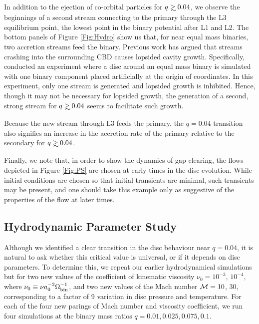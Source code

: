 In addition to the ejection of co-orbital particles for $q\gsim 0.04$,
we observe the beginnings of a second stream connecting to the primary
through the L3 equilibrium point, the lowest point in the
binary potential after L1 and L2. The bottom panels of Figure
\ref{Fig:Hydro} show us that, for near equal mass binaries, two accretion streams feed the binary. 
Previous work \citep{ShiKrolik:2012, DHM:2013:MNRAS} has argued 
that streams crashing into the surrounding CBD causes lopsided cavity growth. Specifically, \citep{DHM:2013:MNRAS} conducted an experiment where a disc around an equal mass binary is simulated with one binary component placed artificially at the origin of coordinates. In this experiment, only one stream is generated and lopsided growth is inhibited. Hence, though it may not be necessary for lopsided growth, the generation of a second, strong stream for $q \gsim 0.04$ seems to facilitate such growth.

Because the new stream through L3 feeds the primary,
the $q=0.04$ transition also signifies an increase in the accretion
rate of the primary relative to the secondary for $q\gsim0.04$.

Finally, we note that, in order to show the dynamics of gap clearing, 
the flows depicted in Figure \ref{Fig:PS} are chosen at early times in the disc 
evolution. While initial conditions are chosen so that initial transients 
are minimal, such transients may be present, and one should take 
this example only as suggestive of the properties of the flow at later times.

\subsection{Hydrodynamic Parameter Study}
\label{ParamStudy}
Although we identified a clear transition in the disc behaviour near
$q=0.04$, it is natural to ask whether this critical value is universal,
or if it depends on disc parameters. To determine this, we repeat our earlier
hydrodynamical simulations but for two new values of the coefficient
of kinematic viscosity $\nu_0 = 10^{-3} $, $10^{-4}$, where $\nu_0
\equiv \nu a^{-2}_0 \Omega^{-1}_{\rm{bin}}$, and two new values of the
Mach number $\mathcal{M} = 10$, $30$, corresponding to a factor of 9
variation in disc pressure and temperature. For each of the four new parings of Mach
number and viscosity coefficient, we run four simulations at the
binary mass ratios $q=0.01, 0.025, 0.075, 0.1$.

